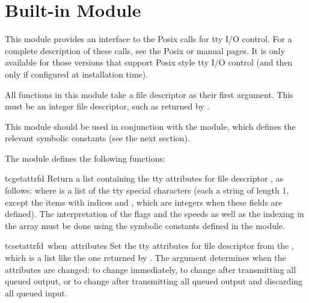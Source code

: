 \section{Built-in Module }
\label{module-termios}

\renewcommand{\indexsubitem}{(in module termios)}

This module provides an interface to the Posix calls for tty I/O
control.  For a complete description of these calls, see the Posix or
\UNIX{} manual pages.  It is only available for those \UNIX{} versions
that support Posix  style tty I/O control (and then
only if configured at installation time).

All functions in this module take a file descriptor  as their
first argument.  This must be an integer file descriptor, such as
returned by .

This module should be used in conjunction with the 
module, which defines the relevant symbolic constants (see the next
section).

The module defines the following functions:

\begin{funcdesc}{tcgetattr}{fd}
Return a list containing the tty attributes for file descriptor
, as follows:  where  is
a list of the tty special characters (each a string of length 1,
except the items with indices  and , which are
integers when these fields are defined).  The interpretation of the
flags and the speeds as well as the indexing in the  array
must be done using the symbolic constants defined in the
 module.
\end{funcdesc}

\begin{funcdesc}{tcsetattr}{fd\, when\, attributes}
Set the tty attributes for file descriptor  from the
, which is a list like the one returned by
.  The  argument determines when the
attributes are changed:  to change immediately,
 to change after transmitting all queued
output, or  to change after transmitting all
queued output and discarding all queued input.
\end{funcdesc}

